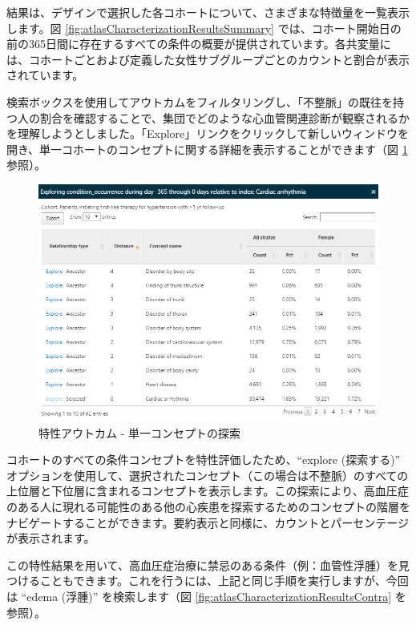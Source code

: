 \documentclass[
  11pt]{book}
\theoremstyle{definition}
\theoremstyle{definition}
\theoremstyle{definition}
\theoremstyle{definition}
\theoremstyle{remark}
\begin{document}
結果は、デザインで選択した各コホートについて、さまざまな特徴量を一覧表示します。図 \ref{fig:atlasCharacterizationResultsSummary} では、コホート開始日の前の365日間に存在するすべての条件の概要が提供されています。各共変量には、コホートごとおよび定義した女性サブグループごとのカウントと割合が表示されています。

検索ボックスを使用してアウトカムをフィルタリングし、「不整脈」の既往を持つ人の割合を確認することで、集団でどのような心血管関連診断が観察されるかを理解しようとしました。「Explore」リンクをクリックして新しいウィンドウを開き、単一コホートのコンセプトに関する詳細を表示することができます（図 \ref{fig:atlasCharacterizationResultsExplore} 参照）。

\begin{figure}

{\centering \includegraphics[width=1\linewidth]{images/Characterization/atlasCharacterizationResultsExplore} 

}

\caption{特性アウトカム - 単一コンセプトの探索}\label{fig:atlasCharacterizationResultsExplore}
\end{figure}

コホートのすべての条件コンセプトを特性評価したため、``explore (探索する)'' オプションを使用して、選択されたコンセプト（この場合は不整脈）のすべての上位層と下位層に含まれるコンセプトを表示します。この探索により、高血圧症のある人に現れる可能性のある他の心疾患を探索するためのコンセプトの階層をナビゲートすることができます。要約表示と同様に、カウントとパーセンテージが表示されます。

この特性結果を用いて、高血圧症治療に禁忌のある条件（例：血管性浮腫）を見つけることもできます。これを行うには、上記と同じ手順を実行しますが、今回は ``edema (浮腫)'' を検索します（図 \ref{fig:atlasCharacterizationResultsContra} を参照）。
\end{document}
